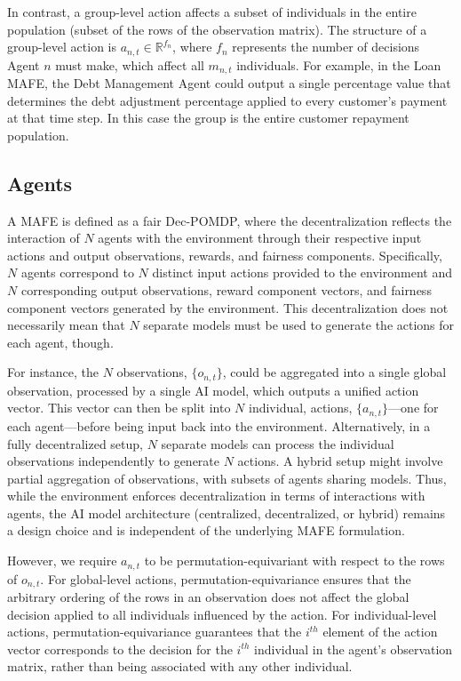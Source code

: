 In contrast, a group-level action affects a subset of individuals in the entire population (subset of the rows of the  observation matrix). The structure of a group-level action is $a_{n,t}\in\mathbb{R}^{f_n}$, where $f_n$ represents the number of decisions Agent $n$ must make, which affect all $m_{n,t}$ individuals. For example, in the Loan MAFE, the Debt Management Agent could output a single percentage value that determines the debt adjustment percentage applied to every customer's payment at that time step. In this case the group is the entire customer repayment population.


\subsection{Agents}

A MAFE is defined as a fair Dec-POMDP, where the decentralization reflects the interaction of $N$ agents with the environment through their respective input actions and output observations, rewards, and fairness components. Specifically, $N$ agents correspond to $N$ distinct input actions provided to the environment and $N$ corresponding output observations, reward component vectors, and fairness component vectors generated by the environment. This decentralization does not necessarily mean that $N$ separate models must be used to generate the actions for each agent, though.

For instance, the $N$ observations, $\{o_{n,t}\}$, could be aggregated into a single global observation, processed by a single AI model, which outputs a unified action vector. This vector can then be split into $N$ individual,  actions, $\{a_{n,t}\}$—one for each agent—before being input back into the environment. Alternatively, in a fully decentralized setup, $N$ separate models can process the individual observations independently to generate $N$ actions. A hybrid setup might involve partial aggregation of observations, with subsets of agents sharing models. Thus, while the environment enforces decentralization in terms of interactions with agents, the AI model architecture (centralized, decentralized, or hybrid) remains a design choice and is independent of the underlying MAFE formulation.

However, we require $a_{n,t}$ to be permutation-equivariant with respect to the rows of $o_{n,t}$. For global-level actions, permutation-equivariance ensures that the arbitrary ordering of the rows in an observation does not affect the global decision applied to all individuals influenced by the action. For individual-level actions, permutation-equivariance guarantees that the $i^{th}$ element of the action vector corresponds to the decision for the $i^{th}$ individual in the agent’s observation matrix, rather than being associated with any other individual.

